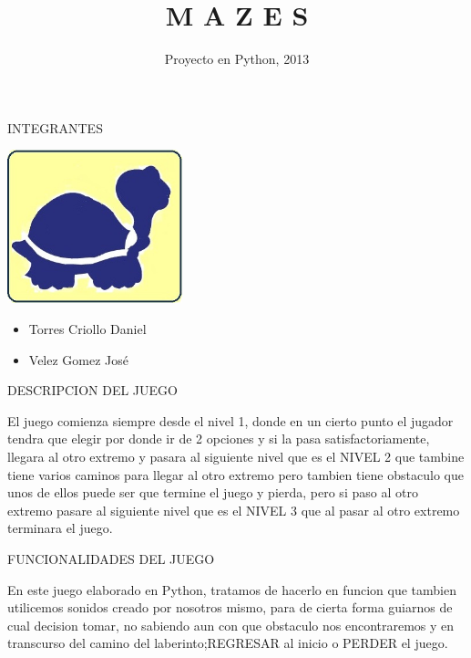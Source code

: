 \documentclass{beamer}
\title[PROYECTO - PYTHON] 
{M A Z E S}
\subtitle{}
\institute[ESCUELA SUPERIOR]
{	
	\centering
  		
	ESCUELA SUPERIOR\\
	POLITECNICA DEL LITORAL
}
\date[CFP 2013]{Proyecto en Python, 2013}
\begin{document}
	\begin{frame}
  	  \titlepage
	\end{frame}
	
	\begin {frame}{INTEGRANTES}
		 \begin{flushleft}
 			\includegraphics[totalheight=1.2in,width=2in]{LTwitspol}
 		 \end{flushleft}
 		 
 		 \begin{itemize}
 		 	\item
				\begin{flushright} 		 		
 		 		Torres Criollo Daniel
 		 		\end{flushright}
 		 	\item
 		 		\begin{flushright}
 		 			Velez Gomez José
 		 		\end{flushright}
 		 \end{itemize}
  	\end{frame}
  	  	
  	\begin{frame}{DESCRIPCION DEL JUEGO}
  		\centering
  		\begin{block}{}
  		El juego comienza siempre desde el nivel 1, donde en un cierto punto el jugador tendra que elegir por donde ir de 2 opciones y si la pasa satisfactoriamente, llegara al otro extremo y pasara al siguiente nivel que es el NIVEL 2 que tambine tiene varios caminos para llegar al otro extremo pero tambien tiene obstaculo que unos de ellos puede ser que termine el juego y pierda, pero si paso al otro extremo pasare al siguiente nivel que es el NIVEL 3 que al pasar al otro extremo terminara el juego.
  		\end{block}				
	\end{frame}
	
	\begin{frame}{FUNCIONALIDADES DEL JUEGO}
		\centering
  		\begin{block}{}
  		En este juego elaborado en Python, tratamos de hacerlo en funcion que tambien utilicemos sonidos creado por nosotros mismo, para de cierta forma guiarnos de cual decision tomar, no sabiendo aun con que obstaculo nos encontraremos y en transcurso del camino del laberinto;REGRESAR al inicio o PERDER el juego.	
  		\end{block}				
	\end{frame}
	
\end{document}
